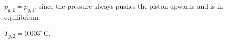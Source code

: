 \( p_{g,2} = p_{g,1} \), since the pressure always pushes the piston upwards and is in equilibrium.  

\( T_{g,2} = 0.003^\circ \, \text{C} \).  

---